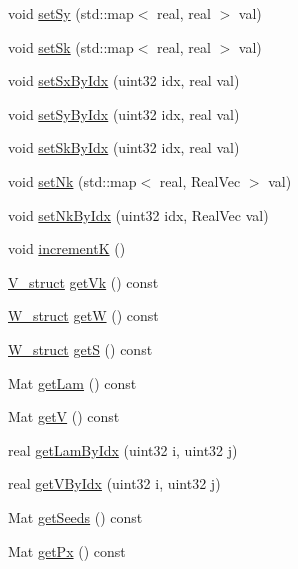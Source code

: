 \begin{DoxyCompactItemize}
\item 
void \mbox{\hyperlink{classvd_af103a45c726643e96f69be4363ad2409}{set\+Sy}} (std\+::map$<$ real, real $>$ val)
\item 
void \mbox{\hyperlink{classvd_a42dc1ab4c7033c49c0b3716d461ad2ef}{set\+Sk}} (std\+::map$<$ real, real $>$ val)
\item 
void \mbox{\hyperlink{classvd_a440d47d94f489ceefa9037be51daef66}{set\+Sx\+By\+Idx}} (uint32 idx, real val)
\item 
void \mbox{\hyperlink{classvd_a5407f9c20ed4ff2300ccbebb999d1dde}{set\+Sy\+By\+Idx}} (uint32 idx, real val)
\item 
void \mbox{\hyperlink{classvd_a578ca6980896563397214c584401c7f5}{set\+Sk\+By\+Idx}} (uint32 idx, real val)
\item 
void \mbox{\hyperlink{classvd_aa1a3d9448f6ff6f8076b15c9e9a63d7e}{set\+Nk}} (std\+::map$<$ real, Real\+Vec $>$ val)
\item 
void \mbox{\hyperlink{classvd_aa45da38425cbd5b48f61313323ba6204}{set\+Nk\+By\+Idx}} (uint32 idx, Real\+Vec val)
\item 
void \mbox{\hyperlink{classvd_a59c1f5756af7de9cc7a0089221cbd5b7}{incrementK}} ()
\item 
\mbox{\hyperlink{structV__struct}{V\+\_\+struct}} \mbox{\hyperlink{classvd_a090bebdbbff36888934c870daf3dcb36}{get\+Vk}} () const
\item 
\mbox{\hyperlink{structW__struct}{W\+\_\+struct}} \mbox{\hyperlink{classvd_ab4d0d9ea76cedf1a6825b62c9ec2d118}{getW}} () const
\item 
\mbox{\hyperlink{structW__struct}{W\+\_\+struct}} \mbox{\hyperlink{classvd_a7f901e0c6d226b81f262c2363a69844a}{getS}} () const
\item 
Mat \mbox{\hyperlink{classvd_a37c4ab12669eb276fe7fa4a610310345}{get\+Lam}} () const
\item 
Mat \mbox{\hyperlink{classvd_aad4ea5c045b8380f83b0490af2fee0fa}{getV}} () const
\item 
real \mbox{\hyperlink{classvd_ae0ec132e647b7d9662bf2bfbf95e7297}{get\+Lam\+By\+Idx}} (uint32 i, uint32 j)
\item 
real \mbox{\hyperlink{classvd_a27d44f2c94b55723e9982446696b5cee}{get\+V\+By\+Idx}} (uint32 i, uint32 j)
\item 
Mat \mbox{\hyperlink{classvd_a82f353c594c3c6b24f6077398f059d3a}{get\+Seeds}} () const
\item 
Mat \mbox{\hyperlink{classvd_aeba6d318016c8f8b9537ce4c0314f8cd}{get\+Px}} () const
\item 

\end{DoxyCompactItemize}
